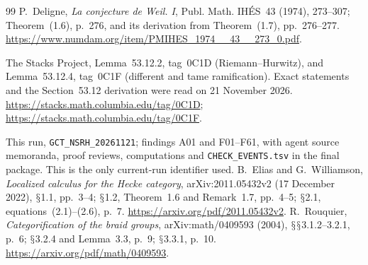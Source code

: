 \documentclass[11pt,a4paper]{article}
\renewcommand{\S}{\ensuremath{\mathsection}}
\theoremstyle{named}\newtheorem{finding}{Finding}[section]
\theoremstyle{definition}\newtheorem{definition}[finding]{Definition}
\theoremstyle{remark}\newtheorem{remark}[finding]{Remark}
\begin{document}
\begin{thebibliography}{99}
 P.~Deligne, \emph{La conjecture de Weil. I},
Publ. Math. IH\'ES~43 (1974), 273--307; Theorem~(1.6), p.~276,
and its derivation from Theorem~(1.7), pp.~276--277.
\url{https://www.numdam.org/item/PMIHES_1974__43__273_0.pdf}.

 The Stacks Project, Lemma~53.12.2, tag~0C1D (Riemann--Hurwitz), and Lemma~53.12.4, tag~0C1F (different and tame ramification). Exact statements and the Section~53.12 derivation were read on 21 November 2026. \url{https://stacks.math.columbia.edu/tag/0C1D}; \url{https://stacks.math.columbia.edu/tag/0C1F}.

 This run, \texttt{GCT\_NSRH\_20261121}; findings A01 and F01--F61, with agent source memoranda, proof reviews, computations and \texttt{CHECK\_EVENTS.tsv} in the final package. This is the only current-run identifier used.
 B.~Elias and G.~Williamson,
\emph{Localized calculus for the Hecke category},
arXiv:2011.05432v2 (17 December 2022),
\S1.1, pp.~3--4; \S1.2, Theorem~1.6 and Remark~1.7,
pp.~4--5; \S2.1, equations~(2.1)--(2.6), p.~7.
\url{https://arxiv.org/pdf/2011.05432v2}.
 R.~Rouquier,
\emph{Categorification of the braid groups},
arXiv:math/0409593 (2004),
\S\S3.1.2--3.2.1, p.~6; \S3.2.4 and Lemma~3.3, p.~9;
\S3.3.1, p.~10.
\url{https://arxiv.org/pdf/math/0409593}.
\end{thebibliography}
\end{document}
